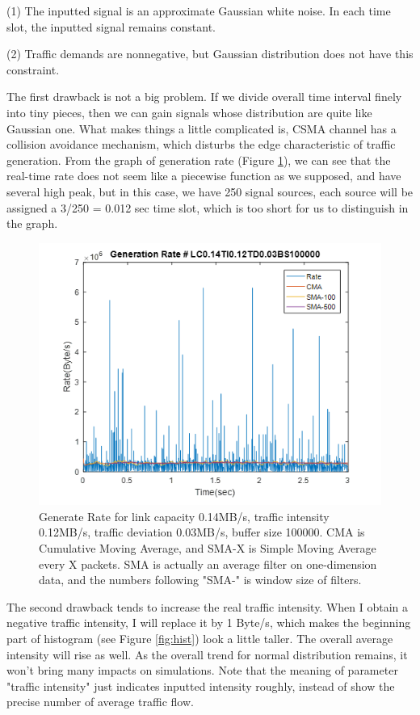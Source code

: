 \documentclass[a4paper]{article}
\begin{document}
(1) The inputted signal is an approximate Gaussian white noise. In each time slot, the inputted signal remains constant.

(2) Traffic demands are nonnegative, but Gaussian distribution does not have this constraint.


The first drawback is not a big problem. If we divide overall time interval finely into tiny pieces, then we can gain signals whose distribution are quite like Gaussian one. What makes things a little complicated is, CSMA channel has a collision avoidance mechanism, which disturbs the edge characteristic of traffic generation. From the graph of generation rate (Figure \ref{fig:GRV}), we can see that the real-time rate does not seem like a piecewise function as we supposed, and have several high peak, but in this case, we have 250 signal sources, each source will be assigned a 3/250 = 0.012 sec time slot, which is too short for us to distinguish in the graph.

\begin{figure}
\centering
\includegraphics[width=1\textwidth]{GRV.png}
\caption{\label{fig:GRV}Generate Rate for link capacity 0.14MB/s, traffic intensity 0.12MB/s, traffic deviation 0.03MB/s, buffer size 100000. CMA is Cumulative Moving Average, and SMA-X is Simple Moving Average every X packets. SMA is actually an average filter on one-dimension data, and the numbers following "SMA-" is window size of filters.}
\end{figure}


The second drawback tends to increase the real traffic intensity. When I obtain a negative traffic intensity, I will replace it by 1 Byte/s, which makes the beginning part of histogram (see Figure \ref{fig:hist}) look a little taller. The overall average intensity will rise as well. As the overall trend for normal distribution remains, it won't bring many impacts on simulations. Note that the meaning of parameter "traffic intensity" just indicates inputted intensity roughly, instead of show the precise number of average traffic flow.
\end{document}
